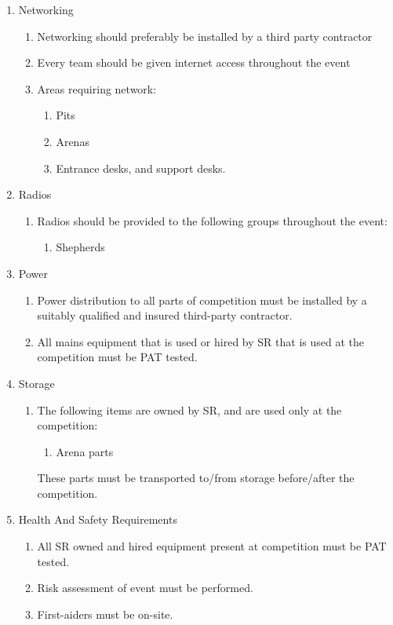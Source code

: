 \begin{enumerate}
\begin{enumerate}
  \item Networking
    \begin{enumerate}
    \item Networking should preferably be installed by a third party contractor
    \item Every team should be given internet access throughout the event
    \item Areas requiring network:
      \begin{enumerate}
      \item Pits
      \item Arenas
      \item Entrance desks, and support desks.
      \end{enumerate}
    \end{enumerate}

  \item Radios
    \begin{enumerate}
    \item Radios should be provided to the following groups throughout the event:
      \begin{enumerate}
      \item Shepherds
      \end{enumerate}
    \end{enumerate}

  \item Power
    \begin{enumerate}
    \item Power distribution to all parts of competition must be installed by a suitably qualified and insured third-party contractor.
      \item All mains equipment that is used or hired by SR that is used at the competition must be PAT tested.
    \end{enumerate}

  \item Storage
    \begin{enumerate}
    \item The following items are owned by SR, and are used only at the competition:
      \begin{enumerate}
      \item Arena parts
      \end{enumerate}
      These parts must be transported to/from storage before/after the competition.
    \end{enumerate}


\item Health And Safety Requirements

  \begin{enumerate}
  \item All SR owned and hired equipment present at competition must be PAT tested.
  \item Risk assessment of event must be performed.
  \item First-aiders must be on-site.
  \end{enumerate}

  \end{enumerate}
  \end{enumerate}

